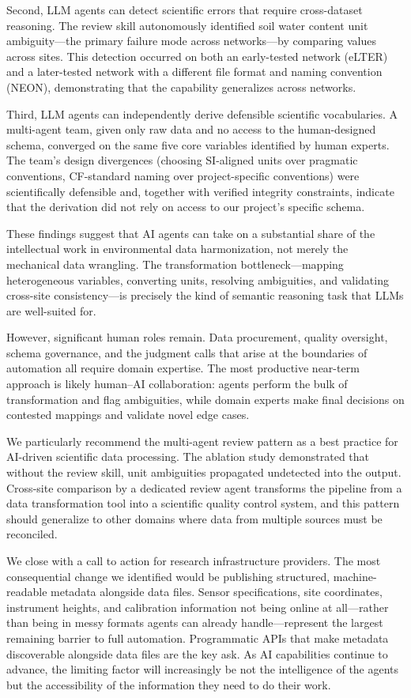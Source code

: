\documentclass[review,authoryear]{elsarticle}
\begin{document}
Second, LLM agents can detect scientific errors that require cross-dataset reasoning. The review skill autonomously identified soil water content unit ambiguity---the primary failure mode across networks---by comparing values across sites. This detection occurred on both an early-tested network (eLTER) and a later-tested network with a different file format and naming convention (NEON), demonstrating that the capability generalizes across networks.

Third, LLM agents can independently derive defensible scientific vocabularies. A multi-agent team, given only raw data and no access to the human-designed schema, converged on the same five core variables identified by human experts. The team's design divergences (choosing SI-aligned units over pragmatic conventions, CF-standard naming over project-specific conventions) were scientifically defensible and, together with verified integrity constraints, indicate that the derivation did not rely on access to our project's specific schema.

These findings suggest that AI agents can take on a substantial share of the intellectual work in environmental data harmonization, not merely the mechanical data wrangling. The transformation bottleneck---mapping heterogeneous variables, converting units, resolving ambiguities, and validating cross-site consistency---is precisely the kind of semantic reasoning task that LLMs are well-suited for.

However, significant human roles remain. Data procurement, quality oversight, schema governance, and the judgment calls that arise at the boundaries of automation all require domain expertise. The most productive near-term approach is likely human--AI collaboration: agents perform the bulk of transformation and flag ambiguities, while domain experts make final decisions on contested mappings and validate novel edge cases.

We particularly recommend the multi-agent review pattern as a best practice for AI-driven scientific data processing. The ablation study demonstrated that without the review skill, unit ambiguities propagated undetected into the output. Cross-site comparison by a dedicated review agent transforms the pipeline from a data transformation tool into a scientific quality control system, and this pattern should generalize to other domains where data from multiple sources must be reconciled.

We close with a call to action for research infrastructure providers. The most consequential change we identified would be publishing structured, machine-readable metadata alongside data files. Sensor specifications, site coordinates, instrument heights, and calibration information not being online at all---rather than being in messy formats agents can already handle---represent the largest remaining barrier to full automation. Programmatic APIs that make metadata discoverable alongside data files are the key ask. As AI capabilities continue to advance, the limiting factor will increasingly be not the intelligence of the agents but the accessibility of the information they need to do their work.
\end{document}
